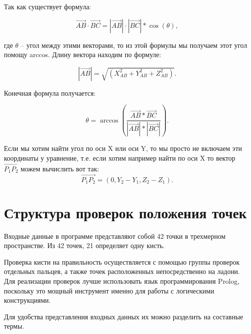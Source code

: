\hspace{0.6cm} Так как существует формула:

\begin{equation} 
\displaystyle  \vec{AB} \cdot \vec{BC} = |\vec{AB}| \cdot |\vec{BC}| * \cos(\theta),
\end{equation}

\hspace{0.6cm} где $\theta$ – угол между этими векторами, то из этой формулы мы получаем этот угол помощу arccos. Длину вектора находим по формуле:

\begin{equation} 
\displaystyle  |\vec{AB}| = \sqrt{(X_{AB}^2 + Y_{AB}^2 + Z_{AB}^2)}.
\end{equation}

\hspace{0.6cm} Конечная формула получается:

\begin{equation} 
\displaystyle  \theta = \arccos(\frac{\vec{AB} * \vec{BC}}{|\vec{AB}| * |\vec{BC}|}).
\end{equation}

\hspace{0.6cm} Если мы хотим найти угол по оси X или оси Y, то мы просто не включаем эти координаты у уравнение, т.е. если хотим например найти по оси X то вектор $\vec{P_{1}P_{2}}$ можем вычислить вот так:
\begin{equation} 
\displaystyle  \vec{P_{1}P_{2}} = (0, Y_2 - Y_1, Z_2 - Z_1).
\end{equation} 
	

\section{Структура проверок положения точек}
\hspace{0.6cm} Входные данные в программе представляют собой 42 точки в трехмерном пространстве. Из 42 точек, 21 определяет одну кисть.

\hspace{0.6cm} Проверка кисти на правильность осуществляется с помощью группы проверок отдельных пальцев, а также точек расположенных непосредственно на ладони. Для реализации проверок лучше использовать язык программирования Prolog, поскольку это мощный инструмент именно для работы с логическими конструкциями.

\hspace{0.6cm} Для удобства представления входных данных их можно разделить на составные термы. 

